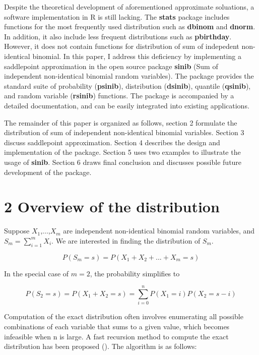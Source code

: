 Despite the theoretical development of aforementioned approximate soluations, a software implementation in R is still lacking. The \textbf{stats} package includes functions for the most frequently used distribution such as \textbf{dbinom} and \textbf{dnorm}. In addition, it also include less frequent distributions such as \textbf{pbirthday}. However, it does not contain functions for distribution of sum of indepedent non-identical binomial. In this paper, I address this deficiency by implementing a saddlepoint approximation in the open source package \textbf{sinib} (Sum of independent non-identical binomial random variables). The package provides the standard suite of probability (\textbf{psinib}), distribution (\textbf{dsinib}), quantile (\textbf{qsinib}), and random variable (\textbf{rsinib}) functions. The package is accompanied by a detailed documentation, and can be easily integrated into existing applications.

The remainder of this paper is organized as follows, section 2 formulate the distribution of sum of independent non-identical binomial variables. Section 3 discuss saddlepoint approximation. Section 4 describes the design and implementation of the package. Section 5 uses two examples to illustrate the usage of \textbf{sinib}. Section 6 draws final conclusion and discusses possible future development of the package. 

\section{2 Overview of the distribution}


Suppose $X_1$,...,$X_m$ are independent non-identical binomial random variables, and $S_m = \sum_{i=1}^{m} X_i$. We are interested in finding the distribution of $S_m$. 

\begin{equation}
P(S_m = s) = P(X_1+X_2+...+X_m = s)
\end{equation}

In the special case of $m = 2$, the probability simplifies to 

\begin{equation}
P(S_2=s) = P(X_1+X_2=s) = \sum_{i=0}^n P(X_1=i) P(X_2=s-i)
\label{eq:2}
\end{equation}

Computation of the exact distribution often involves enumerating all possible combinations of each variable that sums to a given value, which becomes infeasible when n is large. A fast recursion method to compute the exact distribution has been proposed (\cite{Butler:2016cj,ArthurWoodward:1997en}). The algorithm is as follows: 

